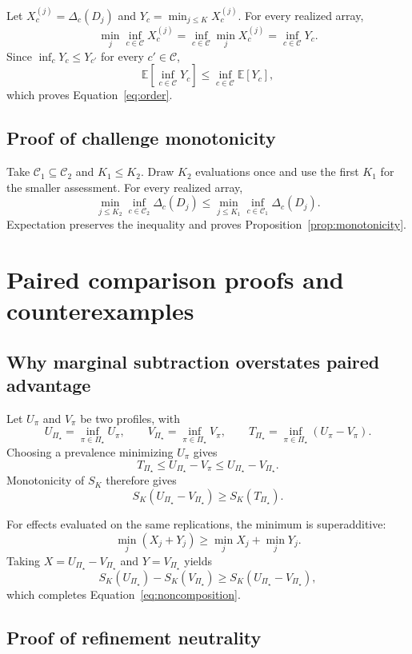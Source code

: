 \documentclass[11pt]{article}
\newcommand{\CSet}{\mathcal{C}}
\newcommand{\PSet}{\Pi_\star}
\newcommand{\E}{\mathbb{E}}
\theoremstyle{remark}
\begin{document}
Let $X_c^{(j)}=\Delta_c(D_j)$ and $Y_c=\min_{j\leq K}X_c^{(j)}$. For every realized array,
\[
\min_j\inf_{c\in\CSet}X_c^{(j)}
=
\inf_{c\in\CSet}\min_jX_c^{(j)}
=
\inf_{c\in\CSet}Y_c.
\]
Since $\inf_c Y_c\leq Y_{c'}$ for every $c'\in\CSet$,
\[
\E\left[\inf_{c\in\CSet}Y_c\right]
\leq
\inf_{c\in\CSet}\E[Y_c],
\]
which proves Equation~\eqref{eq:order}.

\subsection{Proof of challenge monotonicity}

Take $\mathcal C_1\subseteq\mathcal C_2$ and $K_1\leq K_2$. Draw $K_2$ evaluations once and use the first $K_1$ for the smaller assessment. For every realized array,
\[
\min_{j\leq K_2}\inf_{c\in\mathcal C_2}\Delta_c(D_j)
\leq
\min_{j\leq K_1}\inf_{c\in\mathcal C_1}\Delta_c(D_j).
\]
Expectation preserves the inequality and proves Proposition~\ref{prop:monotonicity}.

\section{Paired comparison proofs and counterexamples}
\label{app:paired-proofs}

\subsection{Why marginal subtraction overstates paired advantage}

Let $U_\pi$ and $V_\pi$ be two profiles, with
\[
U_{\PSet}=\inf_{\pi\in\PSet}U_\pi,
\qquad
V_{\PSet}=\inf_{\pi\in\PSet}V_\pi,
\qquad
T_{\PSet}=\inf_{\pi\in\PSet}(U_\pi-V_\pi).
\]
Choosing a prevalence minimizing $U_\pi$ gives
\[
T_{\PSet}
\leq
U_{\PSet}-V_\pi
\leq
U_{\PSet}-V_{\PSet}.
\]
Monotonicity of $S_K$ therefore gives
\[
S_K(U_{\PSet}-V_{\PSet})
\geq
S_K(T_{\PSet}).
\]

For effects evaluated on the same replications, the minimum is superadditive:
\[
\min_j(X_j+Y_j)
\geq
\min_jX_j+\min_jY_j.
\]
Taking $X=U_{\PSet}-V_{\PSet}$ and $Y=V_{\PSet}$ yields
\[
S_K(U_{\PSet})-S_K(V_{\PSet})
\geq
S_K(U_{\PSet}-V_{\PSet}),
\]
which completes Equation~\eqref{eq:noncomposition}.

\subsection{Proof of refinement neutrality}
\end{document}

